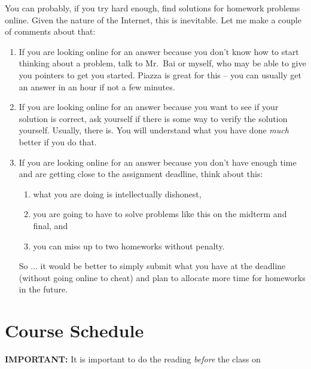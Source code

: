 \documentclass[11pt]{article}
\begin{document}
You can probably, if you try hard enough, find solutions for homework
problems online.    Given the nature of the Internet, this is
inevitable.   Let me make a couple of comments about that:
\begin{enumerate}
\item If you are looking online for an answer because you don't know how
  to start thinking about a problem, talk to Mr.\ Bai or myself, who may be
  able to give you pointers to get you started.  Piazza is great for
  this -- you can usually get an answer in an hour if not a few minutes.
\item If you are looking online for an answer because you want to see if
  your solution is correct, ask yourself if there is some way to verify
  the solution yourself.   Usually, there is.  You will understand what you have done
  \emph{much} better if you do that.
\item If you are looking online for an answer because you don't have
  enough time and are getting close to the assignment deadline, think about this:
  \begin{enumerate}
  \item what you are doing is intellectually dishonest,
  \item you are going to have to solve problems like this on the midterm
    and final, and
  \item you can miss up to two homeworks without penalty.
  \end{enumerate}
So ... it would be better to simply submit what you have at the deadline
(without going online to cheat) and plan to allocate more time for
homeworks in the future.
\end{enumerate}

\newpage
\section*{Course Schedule}

\textbf{IMPORTANT:} It is important to do the reading \emph{before} the class on
\end{document}
